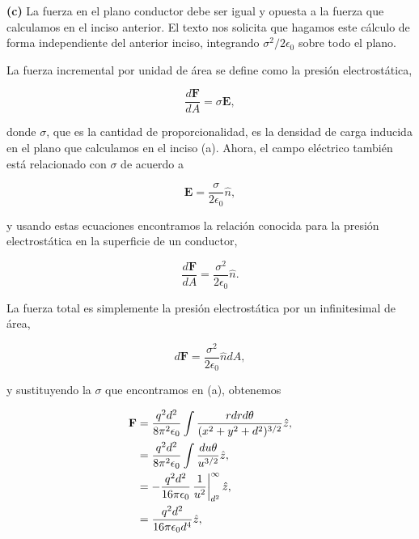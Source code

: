 \documentclass[a4paper,10pt]{article}
\numberwithin{equation}{section}
\newcommand{\zerodel}{.\kern-\nulldelimiterspace}
\begin{document}
\textbf{(c)} La fuerza en el plano conductor debe ser igual y opuesta a la fuerza 
que calculamos en el inciso anterior. El texto nos solicita que hagamos este cálculo 
de forma independiente del anterior inciso, integrando $\sigma^2/2\epsilon_0$ sobre 
todo el plano. 

\vspace{.3cm}

La fuerza incremental por unidad de área se define como la presión electrostática, 

\begin{equation}
 \frac{d\mathbf{F}}{dA} = \sigma\mathbf{E},
\end{equation}

donde $\sigma$, que es la cantidad de proporcionalidad, es la densidad de carga 
inducida en el plano que calculamos en el inciso (a). Ahora, el campo eléctrico 
también está relacionado con $\sigma$ de acuerdo a 

\begin{equation}
 \mathbf{E} = \frac{\sigma}{2\epsilon_0}\hat{n},
\end{equation}

y usando estas ecuaciones encontramos la relación conocida para la presión electrostática 
en la superficie de un conductor, 

\begin{equation}
  \frac{d\mathbf{F}}{dA} = \frac{\sigma^2}{2\epsilon_0}\hat{n}.
\end{equation}

La fuerza total es simplemente la presión electrostática por un infinitesimal de 
área, 

\begin{equation}
 d\mathbf{F} = \frac{\sigma^2}{2\epsilon_0}\hat{n}dA,
\end{equation}

y sustituyendo la $\sigma$ que encontramos en (a), obtenemos 

\begin{align*}
 \mathbf{F} &= \frac{q^2d^2}{8\pi^2\epsilon_0}\int 
 \frac{rdrd\theta}{(x^2+y^2+d^2)^{3/2}} \hat{z}, \\
%
  &= \frac{q^2d^2}{8\pi^2\epsilon_0}\int 
 \frac{du\theta}{u^{3/2}}\hat{z}, \\
 &= - \frac{q^2d^2}{16\pi\epsilon_0}\left\zerodel\frac{1}{u^2}\right|_{d^2}^\infty\hat{z}, \\
 &= \frac{q^2d^2}{16\pi\epsilon_0d^4}\hat{z},
\end{align*}
\end{document}
